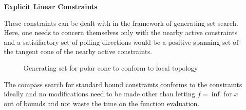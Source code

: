 \textbf{Explicit Linear Constraints}

These constraints can be dealt with in the framework of generating set search.  Here, one needs to concern themselves only with the nearby active constraints and a satisifactory set of polling directions would be a positive spanning set of the tangent cone of the nearby active constraints. 
\begin{figure}
\centering

\caption{Generating set for polar cone to conform to local topology}
\end{figure}
The compass search for standard bound constraints conforms to the constraints ideally and no modifications need to be made other than letting $f = \inf $ for $x$ out of bounds and not waste the time on the function evaluation.
